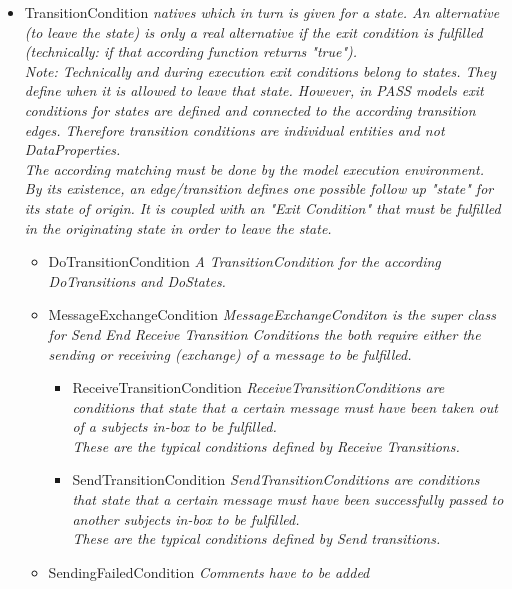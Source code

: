 \begin{itemize}
\begin{itemize}
\begin{itemize}
\begin{itemize}
			\item TransitionCondition \linebreak \textit{natives which in turn is given for a state. An alternative (to leave the state) is only a real alternative if the exit condition is fulfilled (technically: if that according function returns "true"). \\Note: Technically and during execution exit conditions belong to states. They define when it is allowed to leave that state. However, in PASS models exit conditions for states are defined and connected to the according transition edges. Therefore transition conditions are individual entities and not DataProperties.\\ The according matching must be done by the model execution environment.\\ By its existence, an edge/transition defines one possible follow up "state" for its state of origin. It is coupled with an "Exit Condition" that must be fulfilled in the originating state in order to leave the state.}
			\begin{itemize}
				\item DoTransitionCondition \linebreak \textit{A TransitionCondition for the according DoTransitions and DoStates. }
				\item MessageExchangeCondition \linebreak \textit{MessageExchangeConditon is the super class for Send End Receive Transition Conditions the both require either the sending or receiving (exchange) of a message to be fulfilled.}
				\begin{itemize}
					\item ReceiveTransitionCondition \linebreak \textit{ReceiveTransitionConditions are conditions that state that a certain message must have been taken out of a subjects in-box to be fulfilled.\\ These are the typical conditions defined by Receive Transitions.}
					\item SendTransitionCondition \linebreak \textit{SendTransitionConditions are conditions that state that a certain message must have been successfully passed to another subjects in-box to be fulfilled.\\ These are the typical conditions defined by Send transitions.}
				\end {itemize}
				\item SendingFailedCondition \linebreak \textit{Comments have to be added}

\end{itemize}
\end{itemize}
\end{itemize}
\end{itemize}
\end{itemize}
